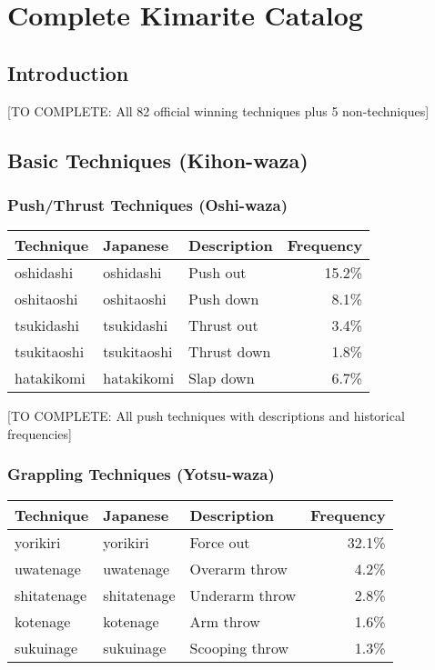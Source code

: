 \chapter{Complete Kimarite Catalog}

\section{Introduction}

[TO COMPLETE: All 82 official winning techniques plus 5 non-techniques]

\section{Basic Techniques (Kihon-waza)}

\subsection{Push/Thrust Techniques (Oshi-waza)}

\begin{longtable}{lllr}
\toprule
Technique & Japanese & Description & Frequency \\
\midrule
\endhead
oshidashi & oshidashi & Push out & 15.2\% \\
oshitaoshi & oshitaoshi & Push down & 8.1\% \\
tsukidashi & tsukidashi & Thrust out & 3.4\% \\
tsukitaoshi & tsukitaoshi & Thrust down & 1.8\% \\
hatakikomi & hatakikomi & Slap down & 6.7\% \\
\bottomrule
\end{longtable}

[TO COMPLETE: All push techniques with descriptions and historical frequencies]

\subsection{Grappling Techniques (Yotsu-waza)}

\begin{longtable}{lllr}
\toprule
Technique & Japanese & Description & Frequency \\
\midrule
\endhead
yorikiri & yorikiri & Force out & 32.1\% \\
uwatenage & uwatenage & Overarm throw & 4.2\% \\
shitatenage & shitatenage & Underarm throw & 2.8\% \\
kotenage & kotenage & Arm throw & 1.6\% \\
sukuinage & sukuinage & Scooping throw & 1.3\% \\
\bottomrule
\end{longtable}

